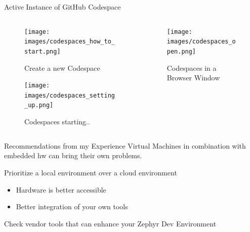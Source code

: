 \documentclass[10pt, aspectratio=169]{beamer}
\begin{document}
\begin{frame}[fragile]{Active Instance of GitHub Codespace}
  \begin{columns}
    \begin{column}{0.4\textwidth}
      \begin{figure}
        \texttt{[image: images/codespaces\_how\_to\_start.png]}
        \caption{Create a new Codespace}
      \end{figure}
      \begin{figure}
        \texttt{[image: images/codespaces\_setting\_up.png]}
        \caption{Codespaces starting..}
      \end{figure}
    \end{column}
    \begin{column}{0.6\textwidth}
      \begin{figure}
        \texttt{[image: images/codespaces\_open.png]}
        \caption{Codespaces in a Browser Window}
      \end{figure}
    \end{column}
  \end{columns}
\end{frame}
\begin{frame}[fragile]{Recommendations from my Experience}
Virtual Machines in combination with embedded hw can bring their own problems.

Prioritize a local environment over a cloud environment
  \begin{itemize}
    \item Hardware is better accessible
    \item Better integration of your own tools
  \end{itemize}

        Check vendor tools that can enhance your Zephyr Dev Environment
\end{frame}
\end{document}
